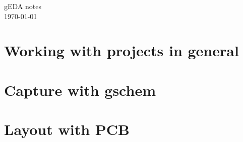 
\newlength{\pad} \setlength{\pad}{.2cm}




\thispagestyle{empty} %
\begin{center}
  {\huge gEDA notes}\\
  \today
\end{center}
\clearpage

\pagestyle{toc}
\tableofcontents
\clearpage \pagestyle{normal}


\part{Working with projects in general}





\part{Capture with gschem}











\part{Layout with PCB}










% 

